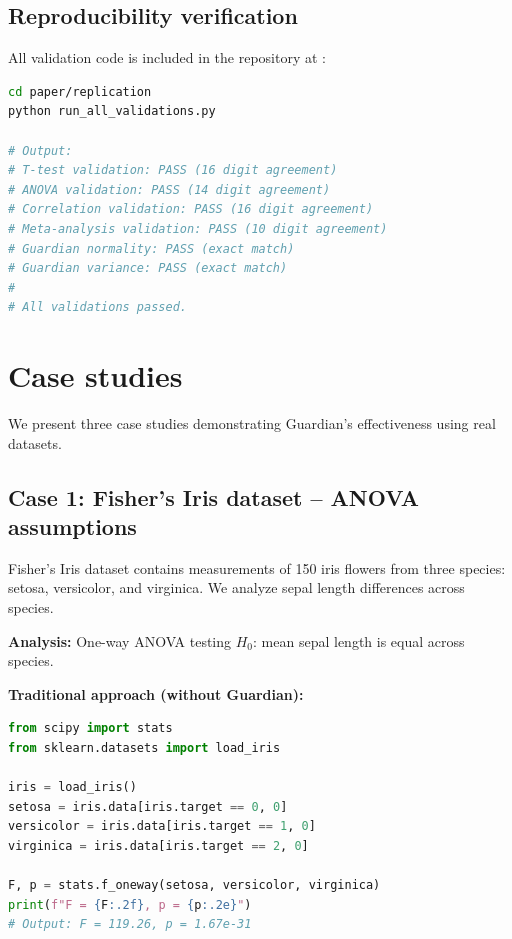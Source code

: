 \documentclass[article]{jss}
\begin{document}
\subsection{Reproducibility verification}

All validation code is included in the repository at :

\begin{lstlisting}[language=bash,caption={Running validation suite}]
cd paper/replication
python run_all_validations.py

# Output:
# T-test validation: PASS (16 digit agreement)
# ANOVA validation: PASS (14 digit agreement)
# Correlation validation: PASS (16 digit agreement)
# Meta-analysis validation: PASS (10 digit agreement)
# Guardian normality: PASS (exact match)
# Guardian variance: PASS (exact match)
#
# All validations passed.
\end{lstlisting}


\section{Case studies} \label{sec:cases}

We present three case studies demonstrating Guardian's effectiveness using real datasets.

\subsection{Case 1: Fisher's Iris dataset -- ANOVA assumptions}

Fisher's Iris dataset \citep{fisher1936use} contains measurements of 150 iris flowers from three species: setosa, versicolor, and virginica. We analyze sepal length differences across species.

\textbf{Analysis:} One-way ANOVA testing $H_0$: mean sepal length is equal across species.

\textbf{Traditional approach (without Guardian):}
\begin{lstlisting}[language=Python]
from scipy import stats
from sklearn.datasets import load_iris

iris = load_iris()
setosa = iris.data[iris.target == 0, 0]
versicolor = iris.data[iris.target == 1, 0]
virginica = iris.data[iris.target == 2, 0]

F, p = stats.f_oneway(setosa, versicolor, virginica)
print(f"F = {F:.2f}, p = {p:.2e}")
# Output: F = 119.26, p = 1.67e-31
\end{lstlisting}
\end{document}
